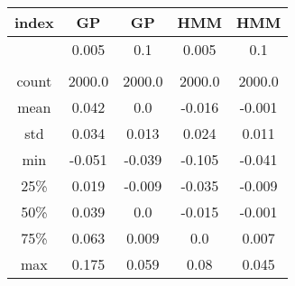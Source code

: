 \centering \begin{tabular}{c|c|c|c|c}
index	&GP	&GP	&HMM	&HMM\\\hline
	&0.005	&0.1	&0.005	&0.1\\
	&	&	&	&\\
count	&2000.0	&2000.0	&2000.0	&2000.0\\
mean	&0.042	&0.0	&-0.016	&-0.001\\
std	&0.034	&0.013	&0.024	&0.011\\
min	&-0.051	&-0.039	&-0.105	&-0.041\\
25\%	&0.019	&-0.009	&-0.035	&-0.009\\
50\%	&0.039	&0.0	&-0.015	&-0.001\\
75\%	&0.063	&0.009	&0.0	&0.007\\
max	&0.175	&0.059	&0.08	&0.045\\
\end{tabular}
